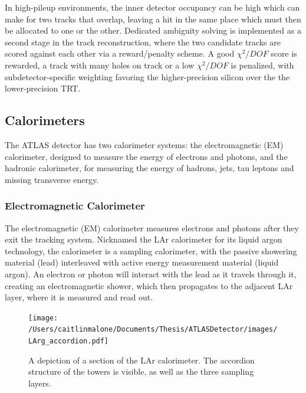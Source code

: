 In high-pileup environments, the inner detector occupancy can be high which can make for two tracks that overlap, leaving a hit in the same place which must then be allocated to one or the other.  Dedicated ambiguity solving is implemented as a second stage in the track reconstruction, where the two candidate tracks are scored against each other via a reward/penalty scheme.  A good $\chi^2/DOF$ score is rewarded, a track with many holes on track or a low $\chi^2/DOF$ is penalized, with subdetector-specific weighting favoring the higher-precision silicon over the the lower-precision TRT. 


\subsection{Calorimeters}
The ATLAS detector has two calorimeter systems: the electromagnetic (EM) calorimeter, designed to measure the energy of electrons and photons, and the hadronic calorimeter, for measuring the energy of hadrons, jets, tau leptons and missing transverse energy.  

\subsubsection{Electromagnetic Calorimeter}
\label{sec:em_cal}

The electromagnetic (EM) calorimeter measures electrons and photons after they exit the tracking system.  Nicknamed the LAr calorimeter for its liquid argon technology,  the calorimeter is a sampling calorimeter, with the passive showering material (lead) interleaved with active energy measurement material (liquid argon).  An electron or photon will interact with the lead as it travels through it, creating an electromagnetic shower, which then propagates to the adjacent LAr layer, where it is measured and read out.


\begin{figure}
\begin{center}
	\texttt{[image: /Users/caitlinmalone/Documents/Thesis/ATLASDetector/images/LArg\_accordion.pdf]}	
	\caption{A depiction of a section of the LAr calorimeter.  The accordion structure of the towers is visible, as well as the three sampling layers. 	\label{fig:lar}}
\end{center}
\end{figure}


